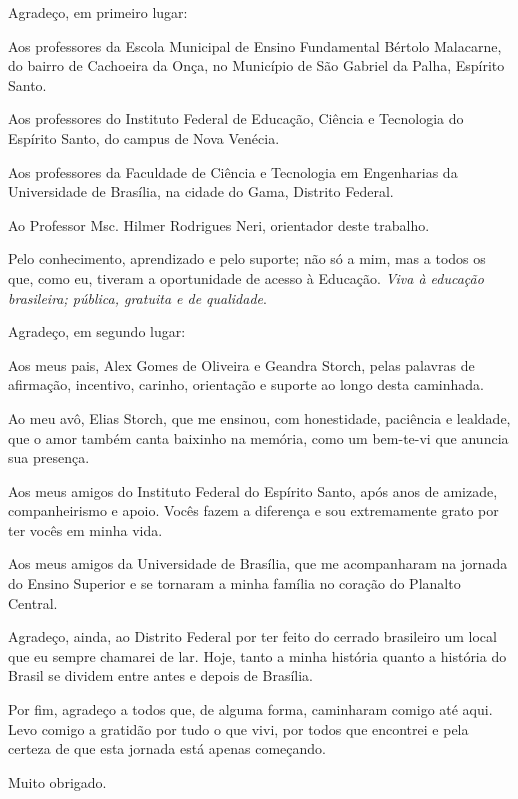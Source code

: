 \begin{agradecimentos}

    Agradeço, em primeiro lugar:

    Aos professores da Escola Municipal de Ensino Fundamental Bértolo Malacarne, do bairro de Cachoeira da Onça, no Município de São Gabriel da Palha, Espírito Santo.

    Aos professores do Instituto Federal de Educação, Ciência e Tecnologia do Espírito Santo, do campus de Nova Venécia.

    Aos professores da Faculdade de Ciência e Tecnologia em Engenharias da Universidade de Brasília,
    na cidade do Gama, Distrito Federal.

    Ao Professor Msc. Hilmer Rodrigues Neri, orientador deste trabalho.

    Pelo conhecimento, aprendizado e pelo suporte; não só a mim, mas a todos os que, como eu, tiveram a oportunidade de acesso à Educação. \emph{Viva à educação brasileira; pública, gratuita e de qualidade}.
   
    Agradeço, em segundo lugar:

    Aos meus pais, Alex Gomes de Oliveira e Geandra Storch, pelas palavras de afirmação, incentivo, carinho, orientação e suporte ao longo desta caminhada.

    Ao meu avô, Elias Storch, que me ensinou, com honestidade, paciência e lealdade, que o amor também canta baixinho na memória, como um bem-te-vi que anuncia sua presença.

    Aos meus amigos do Instituto Federal do Espírito Santo, após anos de amizade, companheirismo e apoio. Vocês fazem a diferença e sou extremamente grato por ter vocês em minha vida.

    Aos meus amigos da Universidade de Brasília, que me acompanharam na jornada do Ensino Superior e se tornaram a minha família no coração do Planalto Central.
    
    Agradeço, ainda, ao Distrito Federal por ter feito do cerrado brasileiro um local que eu sempre chamarei de lar. Hoje, tanto a minha história quanto a história do Brasil se dividem entre antes e depois de Brasília.

   Por fim, agradeço a todos que, de alguma forma, caminharam comigo até aqui. Levo comigo a gratidão por tudo o que vivi, por todos que encontrei e pela certeza de que esta jornada está apenas começando.

    Muito obrigado.
\end{agradecimentos}
